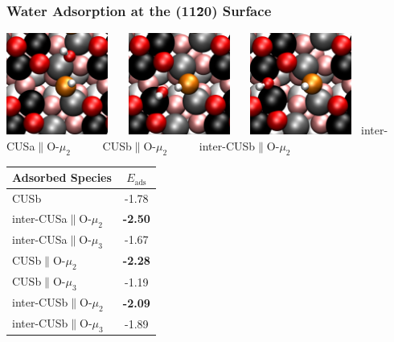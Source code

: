 \documentclass[hyperref={pdfpagelabels=false}]{beamer}
\begin{document}
\begin{frame}
 \frametitle{Water Adsorption at the (11\=20) Surface}
 \centering
\includegraphics[width=0.25\textwidth]{figures/test-iCa2.pdf}~~~
\includegraphics[width=0.25\textwidth]{figures/test-Cb2.pdf}~~~
\includegraphics[width=0.25\textwidth]{figures/test-iCb2.pdf}~\newline
inter-CUSa$\parallel$O-$\mu_2$ ~~~~~CUSb$\parallel$O-$\mu_2$  ~~~~~inter-CUSb$\parallel$O-$\mu_2$~~~
\begin{table}[!ht]
  \centering
 \begin{tabular}{l|c}
  \toprule
   Adsorbed Species  & $E_\textrm{ads}$  \\\midrule
 CUSb          &   -1.78   \\\hline
 inter-CUSa$\parallel$O-$\mu_2$ & \textbf{-2.50}  \\
 inter-CUSa$\parallel$O-$\mu_3$ & -1.67  \\
 CUSb$\parallel$O-$\mu_2$ & \textbf{-2.28}  \\
 CUSb$\parallel$O-$\mu_3$ & -1.19  \\
 inter-CUSb$\parallel$O-$\mu_2$ & \textbf{-2.09} \\
 inter-CUSb$\parallel$O-$\mu_3$ & -1.89 \\\bottomrule
  \end{tabular}
  \label{tab:ads_1water}
\end{table}

\end{frame}
\end{document}
